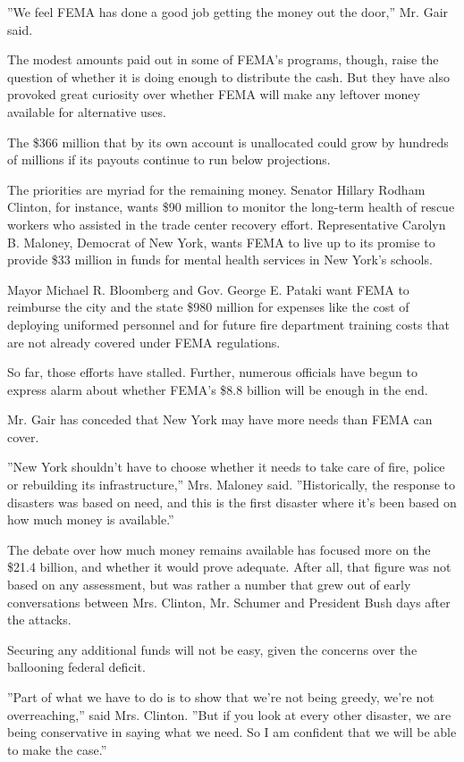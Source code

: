 ''We feel FEMA has done a good job getting the money out the door,'' Mr.
Gair said.

The modest amounts paid out in some of FEMA's programs, though, raise
the question of whether it is doing enough to distribute the cash. But
they have also provoked great curiosity over whether FEMA will make any
leftover money available for alternative uses.

The \$366 million that by its own account is unallocated could grow by
hundreds of millions if its payouts continue to run below projections.

The priorities are myriad for the remaining money. Senator Hillary
Rodham Clinton, for instance, wants \$90 million to monitor the
long-term health of rescue workers who assisted in the trade center
recovery effort. Representative Carolyn B. Maloney, Democrat of New
York, wants FEMA to live up to its promise to provide \$33 million in
funds for mental health services in New York's schools.

Mayor Michael R. Bloomberg and Gov. George E. Pataki want FEMA to
reimburse the city and the state \$980 million for expenses like the
cost of deploying uniformed personnel and for future fire department
training costs that are not already covered under FEMA regulations.

So far, those efforts have stalled. Further, numerous officials have
begun to express alarm about whether FEMA's \$8.8 billion will be enough
in the end.

Mr. Gair has conceded that New York may have more needs than FEMA can
cover.

''New York shouldn't have to choose whether it needs to take care of
fire, police or rebuilding its infrastructure,'' Mrs. Maloney said.
''Historically, the response to disasters was based on need, and this is
the first disaster where it's been based on how much money is
available.''

The debate over how much money remains available has focused more on the
\$21.4 billion, and whether it would prove adequate. After all, that
figure was not based on any assessment, but was rather a number that
grew out of early conversations between Mrs. Clinton, Mr. Schumer and
President Bush days after the attacks.

Securing any additional funds will not be easy, given the concerns over
the ballooning federal deficit.

''Part of what we have to do is to show that we're not being greedy,
we're not overreaching,'' said Mrs. Clinton. ''But if you look at every
other disaster, we are being conservative in saying what we need. So I
am confident that we will be able to make the case.''

